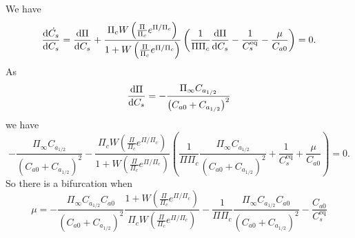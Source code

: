 We have
\begin{equation}
  \label{eq:derivative_of_cs}
  \dv{\dot{C_s}}{C_s} = \dv{\Pi}{C_s} + \frac{\Pi_c W\left(\frac{\Pi}{\Pi_c}e^{\Pi/\Pi_c}\right)}{1+W\left(\frac{\Pi}{\Pi_c}e^{\Pi/\Pi_c}\right)}\left(\frac{1}{\Pi\Pi_c}\dv{\Pi}{C_s} - \frac{1}{C_s^{\mathrm{eq}}} - \frac{\mu}{C_{a0}}\right) = 0.
\end{equation}
As
\begin{equation}
  \label{eq:derivative_of_npp}
  \dv{\Pi}{C_s} = -\frac{\Pi_{\infty}C_{a_{1/2}}}{\left(C_{a0} + C_{a_{1/2}}\right)^2}
\end{equation}
we have
\begin{equation}
  \label{eq:derivative_of_cs_npp}
  -\frac{\Pi_{\infty}C_{a_{1/2}}}{\left(C_{a0} + C_{a_{1/2}}\right)^2} - \frac{\Pi_c W\left(\frac{\Pi}{\Pi_c}e^{\Pi/\Pi_c}\right)}{1+W\left(\frac{\Pi}{\Pi_c}e^{\Pi/\Pi_c}\right)}\left(\frac{1}{\Pi\Pi_c}\frac{\Pi_{\infty}C_{a_{1/2}}}{\left(C_{a0} + C_{a_{1/2}}\right)^2} + \frac{1}{C_s^{\mathrm{eq}}} + \frac{\mu}{C_{a0}}\right) = 0.
\end{equation}
So there is a bifurcation when
\begin{equation}
  \label{eq:bifurcation_mu}
  \mu = -\frac{\Pi_{\infty}C_{a_{1/2}}C_{a0}}{\left(C_{a0} + C_{a_{1/2}}\right)^2}\frac{1+W\left(\frac{\Pi}{\Pi_c}e^{\Pi/\Pi_c}\right)}{\Pi_c W\left(\frac{\Pi}{\Pi_c}e^{\Pi/\Pi_c}\right)}-
  \frac{1}{\Pi\Pi_c}\frac{\Pi_{\infty}C_{a_{1/2}}C_{a0}}{\left(C_{a0} + C_{a_{1/2}}\right)^2} - \frac{C_{a0}}{C_s^{\mathrm{eq}}} 
\end{equation}